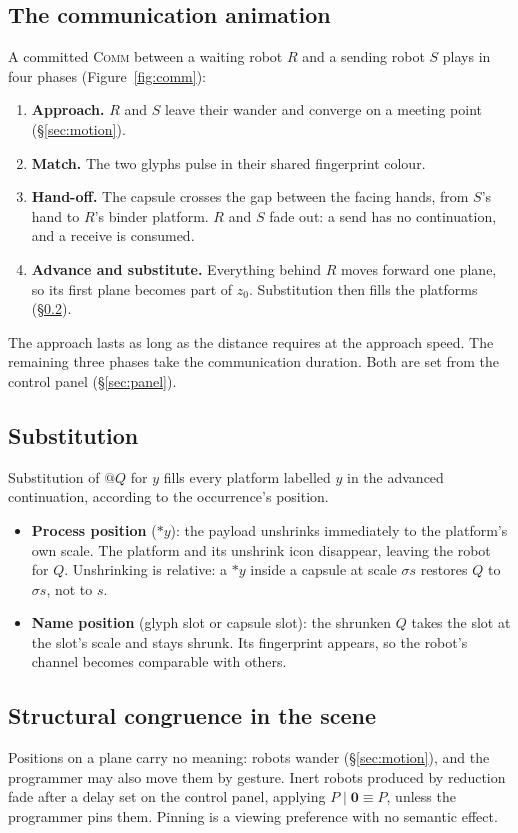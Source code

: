 \documentclass[11pt]{article}
\makeatletter
\newcommand{\rhonil}{\mathbf{0}}
\newcommand{\quot}[1]{@#1}
\newcommand{\drop}[1]{{*}#1}
\newcommand{\zlive}{z_0}
\makeatother
\begin{document}
\subsection{The communication animation}
A committed \textsc{Comm} between a waiting robot $R$ and a sending robot $S$ plays in
four phases (Figure~\ref{fig:comm}):
\begin{enumerate}
  \item \textbf{Approach.} $R$ and $S$ leave their wander and converge on a meeting point
    (\S\ref{sec:motion}).
  \item \textbf{Match.} The two glyphs pulse in their shared fingerprint colour.
  \item \textbf{Hand-off.} The capsule crosses the gap between the facing hands, from $S$'s hand to $R$'s binder platform.
    $R$ and $S$ fade out: a send has no continuation, and a receive is consumed.
  \item \textbf{Advance and substitute.} Everything behind $R$ moves forward one plane,
    so its first plane becomes part of $\zlive$. Substitution then fills the platforms
    (\S\ref{sec:subst}).
\end{enumerate}
The approach lasts as long as the distance requires at the approach speed. The remaining
three phases take the communication duration. Both are set from the control panel
(\S\ref{sec:panel}).

\subsection{Substitution}\label{sec:subst}
Substitution of $\quot{Q}$ for $y$ fills every platform labelled $y$ in the advanced
continuation, according to the occurrence's position.
\begin{itemize}
  \item \textbf{Process position} ($\drop{y}$): the payload unshrinks immediately to the
    platform's own scale. The platform and its unshrink icon disappear, leaving the robot
    for $Q$. Unshrinking is relative: a $\drop{y}$ inside a capsule at scale $\sigma s$
    restores $Q$ to $\sigma s$, not to $s$.
  \item \textbf{Name position} (glyph slot or capsule slot): the shrunken $Q$ takes the
    slot at the slot's scale and stays shrunk. Its fingerprint appears, so the robot's
    channel becomes comparable with others.
\end{itemize}

\subsection{Structural congruence in the scene}\label{sec:congruence}
Positions on a plane carry no meaning: robots wander (\S\ref{sec:motion}), and the programmer
may also move them by gesture.
Inert robots produced by reduction fade after a delay set on the control panel, applying
$P \mid \rhonil \equiv P$, unless the programmer pins them. Pinning is a viewing preference with no
semantic effect.
\end{document}
